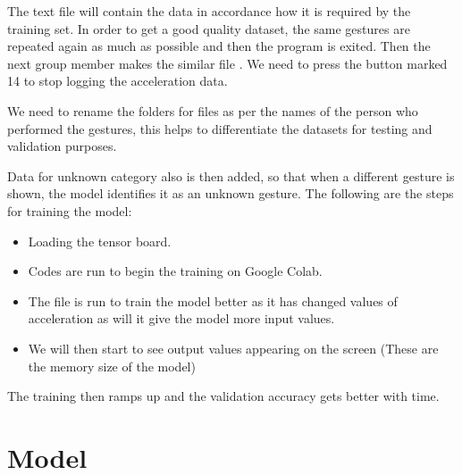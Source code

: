 \bigskip 

The text file will contain the data in accordance how it is required by the training set. In order to get a good quality dataset, the same gestures are repeated again as much as possible and then the program is exited. Then the next group member makes the similar file  . We need to press the button marked 14 to stop logging the acceleration data. \cite{Warden:2020}

We need to rename the folders for files  as per the names of the person who performed the gestures, this helps to differentiate the datasets for testing and validation purposes. \cite{Warden:2020}  

Data for unknown category also is then added, so that when a different gesture is shown, the model identifies it as an unknown gesture.  The following are the steps for training the model:

\begin{itemize}
    \item Loading the tensor board.
    \item Codes are run to begin the training on Google Colab.
    \item The file  is run to train the model better as it has changed values of acceleration as will it give the model more input values.
    \item We will then start to see output values appearing on the screen (These are the memory size of the model)
\end{itemize}

The training then ramps up and the validation accuracy gets better with time.











\section{Model}

